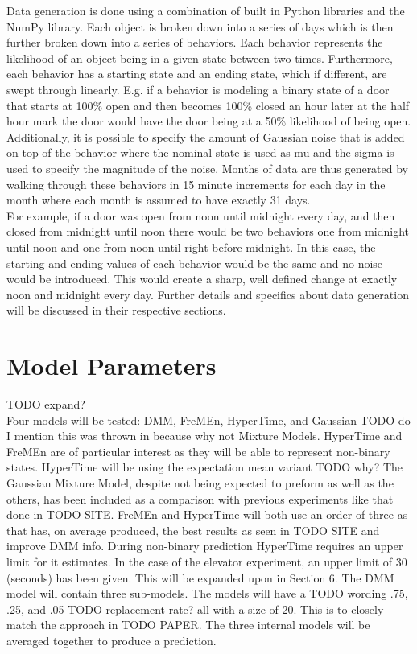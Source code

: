   Data generation is done using a combination of built in Python libraries and
  the NumPy library. Each object is broken down into a series of days which is
  then further broken down into a series of behaviors. Each behavior
  represents the likelihood of an object being in a given state between two
  times.  Furthermore, each behavior has a starting state and an ending state,
  which if different, are swept through linearly. E.g. if a behavior is
  modeling a binary state of a door that starts at 100\% open and then becomes
  100\% closed an hour later at the half hour mark the door would have the
  door being at a 50\% likelihood of being open. Additionally, it is possible
  to specify the amount of Gaussian noise that is added on top of the
  behavior where the nominal state is used as mu and the sigma is used to
  specify the magnitude of the noise. Months of data are thus generated by
  walking through these behaviors in 15 minute increments for each day in the
  month where each month is assumed to have exactly 31 days. \\

  For example, if a door was open from noon until midnight every day, and then closed from
  midnight until noon there would be two behaviors one from midnight until
  noon and one from noon until right before midnight. In this case, the
  starting and ending values of each behavior would be the same and no noise
  would be introduced. This would create a sharp, well defined change at
  exactly noon and midnight every day. Further details and specifics about data
  generation will be discussed in their respective sections. \\

  \section{ Model Parameters }
  TODO expand? \\

  Four models will be tested: DMM, FreMEn, HyperTime, and Gaussian TODO do I mention this was thrown in because why not
  Mixture Models. HyperTime and FreMEn are of particular interest as they will
  be able to represent non-binary states. HyperTime will be using the
  expectation mean variant TODO why? The Gaussian Mixture Model, despite not
  being expected to preform as well as the others, has been included as a
  comparison with previous experiments like that done in TODO SITE. FreMEn and
  HyperTime will both use an order of three as that has, on average produced,
  the best results as seen in TODO SITE and improve DMM info. During
  non-binary prediction HyperTime requires an upper limit for it estimates. In
  the case of the elevator experiment, an upper limit of 30 (seconds) has been
  given. This will be expanded upon in Section 6. The DMM model will
  contain three sub-models. The models will have a TODO wording .75, .25, and
  .05 TODO replacement rate? all with a size of 20. This is to closely match
  the approach in TODO PAPER. The three internal models will be averaged
  together to produce a prediction.\\

